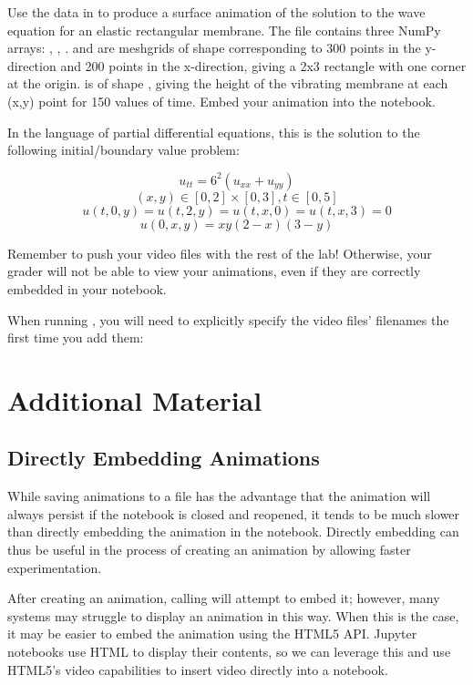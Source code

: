 \begin{problem}
Use the data in  to produce a surface animation of the solution to the wave equation for an elastic rectangular membrane.
The file contains three NumPy arrays: , , .
 and  are meshgrids of shape  corresponding to 300 points in the y-direction and 200 points in the x-direction, giving a 2x3 rectangle with one corner at the origin.
 is of shape , giving the height of the vibrating membrane at each (x,y) point for 150 values of time. 
Embed your animation into the notebook.

In the language of partial differential equations, this is the solution to the following initial/boundary value problem:

$$u_{tt} = 6^2(u_{xx}+u_{yy})$$
$$(x,y) \in [0,2]\times[0,3], t \in [0,5]$$
$$u(t,0,y)=u(t,2,y)=u(t,x,0)=u(t,x,3) = 0$$
$$u(0,x,y) = xy(2-x)(3-y)$$
\end{problem}
\begin{warn}
Remember to push your video files with the rest of the lab!
Otherwise, your grader will not be able to view your animations, even if they are correctly embedded in your notebook.

When running , you will need to explicitly specify the video files' filenames the first time you add them: 
\end{warn}

\newpage
\section*{Additional Material}
\subsection*{Directly Embedding Animations}
While saving animations to a file has the advantage that the animation will always persist if the notebook is closed and reopened, it tends to be much slower than directly embedding the animation in the notebook.
Directly embedding can thus be useful in the process of creating an animation by allowing faster experimentation.

After creating an animation, calling  will attempt to embed it; however, many systems may struggle to display an animation in this way.
When this is the case, it may be easier to embed the animation using the HTML5 API. 
Jupyter notebooks use HTML to display their contents, so we can leverage this and use HTML5's video capabilities to insert video directly into a notebook.

